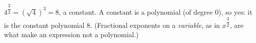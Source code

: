 $4^{\dfrac{3}{2}}=\left(\sqrt4\right)^3=8$, a constant. A constant is a polynomial (of degree $0$), so $\boxed{\text{yes}}$: it is the constant polynomial $8$. (Fractional exponents on a \emph{variable}, as in $x^{\dfrac{3}{2}}$, are what make an expression not a polynomial.)
